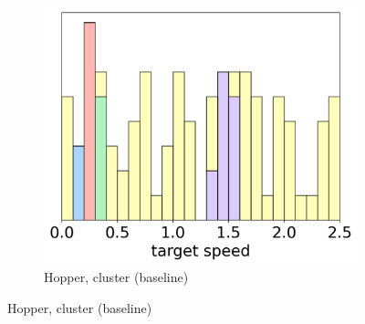 \begin{figure}[t]
\begin{center}
    \begin{subfigure}{0.3\textwidth}
        \centering
        \caption{Hopper, cluster (baseline)}
        \includegraphics[width=\linewidth]{pics/histograms/cluster/Hopper.png}
    \end{subfigure}
    

\end{center}
\end{figure}
